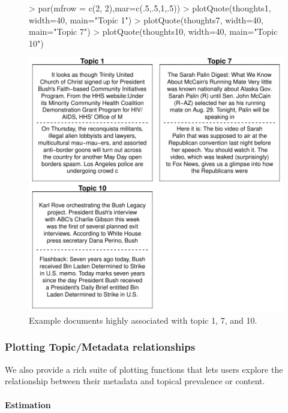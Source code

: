 \documentclass[nojss]{jss}
\begin{document}
\begin{figure}
\begin{center}
\begin{Schunk}
\begin{Sinput}
> par(mfrow = c(2, 2),mar=c(.5,.5,1,.5))
> plotQuote(thoughts1, width=40, main="Topic 1")
> plotQuote(thoughts7, width=40, main="Topic 7")
> plotQuote(thoughts10, width=40, main="Topic 10")
\end{Sinput}
\end{Schunk}
\includegraphics{stmVignette-013}
\caption{Example documents highly associated with topic 1, 7, and 10.}
\label{fig:example}
\end{center}
\end{figure}



\subsubsection{Plotting Topic/Metadata relationships}
We also provide a rich suite of plotting functions that lets users explore the relationship between their metadata and topical prevalence or content.

\paragraph{Estimation}
\end{document}
